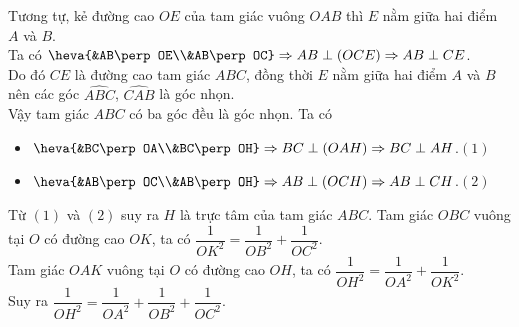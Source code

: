 \begin{ex}
{\begin{itemchoice}
			Tương tự, kẻ đường cao $OE$ của tam giác vuông $OAB$ thì $E$ nằm giữa hai điểm $A$ và  $B$.\\
			 Ta có $\heva{&AB\perp OE\\&AB\perp OC}\Rightarrow AB\perp(OCE)\Rightarrow AB\perp CE$.\\
			Do đó $CE$ là đường cao tam giác $ABC$, đồng thời $E$ nằm giữa hai điểm  $A$ và $B$ nên các góc $\widehat{ABC}$, $\widehat{CAB}$ là góc nhọn.\\
			Vậy tam giác $ABC$ có ba góc đều là  góc nhọn.
			\itemch Ta  có
			\begin{itemize}
				\item $\heva{&BC\perp OA\\&BC\perp OH}\Rightarrow  BC\perp(OAH)\Rightarrow BC\perp AH$.\hfill $(1)$
				\item $\heva{&AB\perp OC\\&AB\perp OH}\Rightarrow AB\perp(OCH)\Rightarrow AB\perp CH$.\hfill $(2)$ 
			\end{itemize}
			Từ $(1)$ và $(2)$  suy ra $H$ là trực tâm của tam giác $ABC$.
			\itemch Tam giác $OBC$ vuông tại $O$ có đường cao $OK$,  ta có $\dfrac{1}{OK^2}=\dfrac{1}{OB^2}+\dfrac{1}{OC^2}$.\\
			Tam giác $OAK$ vuông tại $O$ có đường cao  $OH$, ta có $\dfrac{1}{OH^2}=\dfrac{1}{OA^2}+\dfrac{1}{OK^2}$.\\
			 Suy ra $\dfrac{1}{OH^2}=\dfrac{1}{OA^2}+\dfrac{1}{OB^2}+\dfrac{1}{OC^2}$.
		\end{itemchoice}
	} 
\end{ex}

